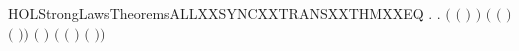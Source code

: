 \newcommand{\HOLStrongLawsTheoremsALLXXSYNCXXTRANSXXTHM}{\UseVerbatim{HOLStrongLawsTheoremsALLXXSYNCXXTRANSXXTHM}}
\begin{SaveVerbatim}{HOLStrongLawsTheoremsALLXXSYNCXXTRANSXXTHMXXEQ}
\HOLTokenTurnstile{} \HOLSymConst{\HOLTokenForall{}}     .
            \HOLTokenTransBegin{}\HOLTokenTransEnd {} \HOLSymConst{\HOLTokenEquiv{}}
       \HOLSymConst{\HOLTokenExists{}}  .
            \HOLSymConst{\HOLTokenLeq{}}  \HOLSymConst{\HOLTokenConj{}}  \HOLSymConst{\HOLTokenLeq{}}  \HOLSymConst{\HOLTokenConj{}} \ensuremath{(} \ensuremath{(} \ensuremath{)} \HOLSymConst{\ensuremath{=}}  \ensuremath{)} \HOLSymConst{\HOLTokenConj{}}
           \ensuremath{(} \ensuremath{(} \ensuremath{)} \HOLSymConst{\ensuremath{=}}  \ensuremath{(} \ensuremath{)}\ensuremath{)} \HOLSymConst{\HOLTokenConj{}} \ensuremath{(} \HOLSymConst{\ensuremath{=}} \HOLConst{\ensuremath{\tau}}\ensuremath{)} \HOLSymConst{\HOLTokenConj{}}
           \ensuremath{(} \HOLSymConst{\ensuremath{=}}  \ensuremath{(} \ensuremath{)} \HOLSymConst{\ensuremath{\mid}}  \ensuremath{(} \ensuremath{)}\ensuremath{)}
\end{SaveVerbatim}
\newcommand{\HOLStrongLawsTheoremsALLXXSYNCXXTRANSXXTHMXXEQ}{\UseVerbatim{HOLStrongLawsTheoremsALLXXSYNCXXTRANSXXTHMXXEQ}}
